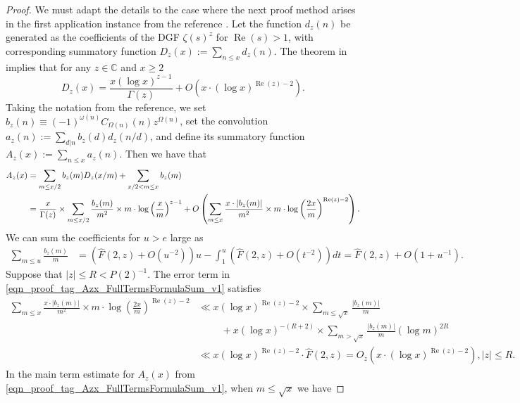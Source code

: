 \documentclass[11pt,reqno,a4letter]{article}
\numberwithin{figure}{section}
\numberwithin{table}{section}
\theoremstyle{plain}
\numberwithin{theorem}{section}
\theoremstyle{definition}
\renewcommand{\Re}{\operatorname{Re}}
\begin{document}
\begin{proof}
We must adapt the details to the case where the next proof method arises in the first 
application instance from the reference \cite[\S 7.4; Thm.\ 7.18]{MV}. 
Let the function $d_z(n)$ be generated as the coefficients of the DGF 
$\zeta(s)^{z}$ for $\Re(s) > 1$, with corresponding 
summatory function $D_z(x) := \sum_{n \leq x} d_z(n)$. 
The theorem in \cite[Thm.\ 7.17; \S 7.4]{MV} implies that for any $z \in \mathbb{C}$ and $x \geq 2$ 
\[
D_z(x) = \frac{x (\log x)^{z-1}}{\Gamma(z)} + O\left(x \cdot (\log x)^{\Re(z)-2}\right). 
\]
Taking the notation from the reference, we set 
$b_z(n) \equiv (-1)^{\omega(n)} C_{\Omega(n)}(n) z^{\Omega(n)}$, set the convolution 
$a_z(n) := \sum_{d|n} b_z(d) d_z(n/d)$, and define its summatory function 
$A_z(x) := \sum_{n \leq x} a_z(n)$. 
Then we have that 
\begin{align} 
\notag 
A_z(x) & = \sum_{m \leq x/2} b_z(m) D_z(x/m) + \sum_{x/2 < m \leq x} b_z(m) \\ 
\label{eqn_proof_tag_Azx_FullTermsFormulaSum_v1} 
     & = \frac{x}{\Gamma(z)} \times \sum_{m \leq x/2} 
     \frac{b_z(m)}{m^2} \times m \cdot \log\left(\frac{x}{m}\right)^{z-1} + 
     O\left(\sum_{m \leq x} \frac{x \cdot |b_z(m)|}{m^2} \times m \cdot 
     \log\left(\frac{2x}{m}\right)^{\Re(z) - 2}\right). 
\end{align} 
We can sum the coefficients for $u > e$ large as 
\begin{align} 
\label{eqn_proof_tag_FsEQ2z_justification_formula} 
\sum_{m \leq u} \frac{b_z(m)}{m} & = (\widehat{F}(2, z) + O(u^{-2})) u - \int_1^{u} 
     (\widehat{F}(2, z) + O(t^{-2})) dt 
     = \widehat{F}(2, z) + O(1 + u^{-1}). 
\end{align} 
Suppose that $|z| \leq R < P(2)^{-1}$. 
The error term in \eqref{eqn_proof_tag_Azx_FullTermsFormulaSum_v1} satisfies 
\begin{align*} 
\sum_{m \leq x} \frac{x \cdot |b_z(m)|}{m^2} \times m \cdot 
     \log\left(\frac{2x}{m}\right)^{\Re(z) - 2} & \ll 
     x (\log x)^{\Re(z) - 2} \times \sum_{m \leq \sqrt{x}} \frac{|b_z(m)|}{m} \\ 
     & \phantom{\ll x\ } + 
     x (\log x)^{-(R+2)} \times \sum_{m > \sqrt{x}} \frac{|b_z(m)|}{m} (\log m)^{2R} \\ 
     & \ll x (\log x)^{\Re(z) - 2} \cdot \widehat{F}(2, z) 
     = O_z\left(x \cdot (\log x)^{\Re(z) - 2}\right), |z| \leq R. 
\end{align*} 
In the main term estimate for $A_z(x)$ from 
\eqref{eqn_proof_tag_Azx_FullTermsFormulaSum_v1}, when $m \leq \sqrt{x}$ we have 

\end{proof}
\end{document}
